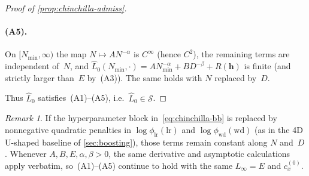 \documentclass[11pt]{article}
\newcommand{\calS}{\mathcal{S}}
\newcommand{\Lhat}{\hat{L}}
\theoremstyle{plain}
\theoremstyle{remark}
\newtheorem*{remark*}{Remark}
\begin{document}
\begin{proof}[Proof of \cref{prop:chinchilla-admiss}]
\paragraph{(A5).}
On $[N_{\min},\infty)$ the map $N \mapsto A N^{-\alpha}$ is $C^\infty$ (hence $C^2$), the remaining terms are independent of~$N$, and
$\Lhat_0(N_{\min},\cdot) = A N_{\min}^{-\alpha} + B D^{-\beta} + R(\mathbf{h})$ is finite
(and strictly larger than~$E$ by~(A3)).
The same holds with $N$ replaced by~$D$.

Thus $\Lhat_0$ satisfies~(A1)--(A5), i.e.\ $\Lhat_0 \in \calS$.
\end{proof}

\begin{remark*}
If the hyperparameter block in~\eqref{eq:chinchilla-bb} is replaced by nonnegative quadratic penalties in
$\log\phi_{\mathrm{lr}}(\mathrm{lr})$ and $\log\phi_{\mathrm{wd}}(\mathrm{wd})$
(as in the 4D U-shaped baseline of \cref{sec:boosting}), those terms remain constant along $N$ and~$D$.
Whenever $A,B,E,\alpha,\beta > 0$, the same derivative and asymptotic calculations apply verbatim, so~(A1)--(A5) continue to hold with the same $L_\infty = E$ and $c_x^{(0)}$.
\end{remark*}
\end{document}
